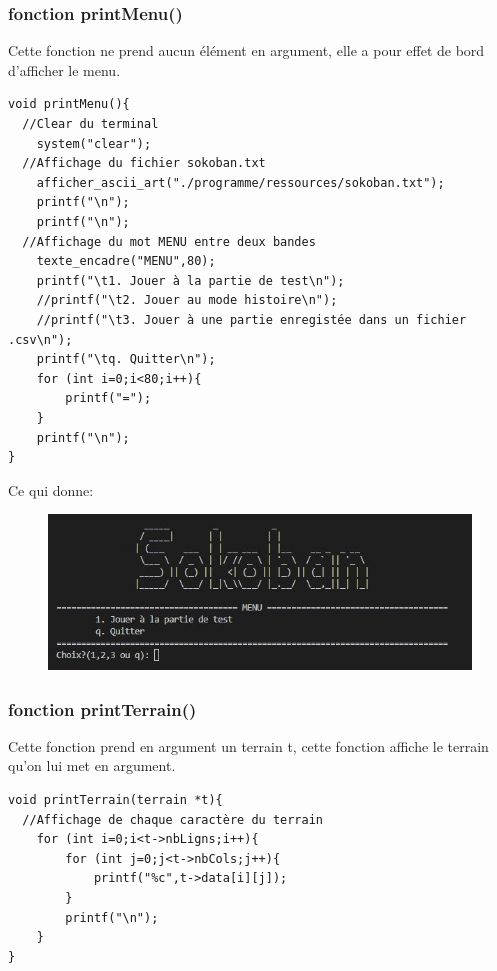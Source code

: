 \documentclass[10pt,a4paper,french,titlepage]{article}
\begin{document}
\subsubsection{fonction printMenu()}
Cette fonction ne prend aucun élément en argument, elle a pour effet de bord d'afficher le menu.
\begin{lstlisting}
void printMenu(){
  //Clear du terminal
    system("clear");
  //Affichage du fichier sokoban.txt
    afficher_ascii_art("./programme/ressources/sokoban.txt");
    printf("\n");
    printf("\n");
  //Affichage du mot MENU entre deux bandes
    texte_encadre("MENU",80);
    printf("\t1. Jouer à la partie de test\n");
    //printf("\t2. Jouer au mode histoire\n");
    //printf("\t3. Jouer à une partie enregistée dans un fichier .csv\n");
    printf("\tq. Quitter\n");
    for (int i=0;i<80;i++){
        printf("=");
    }
    printf("\n");
}
\end{lstlisting}
Ce qui donne:
\begin{figure}[h]
\centering
\includegraphics[scale=0.6]{img/menu.JPG}
\end{figure}
\subsubsection{fonction printTerrain()}
Cette fonction prend en argument un terrain t, cette fonction affiche le terrain qu’on lui met en argument. 
\begin{lstlisting}
void printTerrain(terrain *t){
  //Affichage de chaque caractère du terrain
    for (int i=0;i<t->nbLigns;i++){
        for (int j=0;j<t->nbCols;j++){
            printf("%c",t->data[i][j]);
        }
        printf("\n");
    }
}
\end{lstlisting}
\newpage
\end{document}
